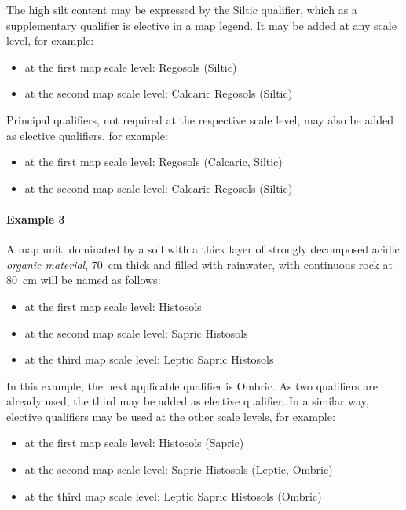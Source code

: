 \documentclass[
  letterpaper,
  DIV=11,
  numbers=noendperiod]{scrreprt}
\let\oldparagraph\paragraph
\renewcommand{\paragraph}[1]{\oldparagraph{#1}\mbox{}}
\providecommand{\tightlist}{%
  \setlength{\itemsep}{0pt}\setlength{\parskip}{0pt}}\usepackage{longtable,booktabs,array}
\begin{document}
The high silt content may be expressed by the Siltic qualifier, which as
a supplementary qualifier is elective in a map legend. It may be added
at any scale level, for example:

\begin{itemize}
\item
  at the first map scale level: Regosols (Siltic)
\item
  at the second map scale level: Calcaric Regosols (Siltic)
\end{itemize}

Principal qualifiers, not required at the respective scale level, may
also be added as elective qualifiers, for example:

\begin{itemize}
\item
  at the first map scale level: Regosols (Calcaric, Siltic)
\item
  at the second map scale level: Calcaric Regosols (Siltic)
\end{itemize}

\hypertarget{example-3}{%
\paragraph{Example 3}\label{example-3}}

A map unit, dominated by a soil with a thick layer of strongly
decomposed acidic \emph{organic material}, 70~cm thick and filled with
rainwater, with continuous rock at 80~cm will be named as follows:

\begin{itemize}
\tightlist
\item
  at the first map scale level: Histosols
\item
  at the second map scale level: Sapric Histosols
\item
  at the third map scale level: Leptic Sapric Histosols
\end{itemize}

In this example, the next applicable qualifier is Ombric. As two
qualifiers are already used, the third may be added as elective
qualifier. In a similar way, elective qualifiers may be used at the
other scale levels, for example:

\begin{itemize}
\tightlist
\item
  at the first map scale level: Histosols (Sapric)
\item
  at the second map scale level: Sapric Histosols (Leptic, Ombric)
\item
  at the third map scale level: Leptic Sapric Histosols (Ombric)
\end{itemize}
\end{document}

